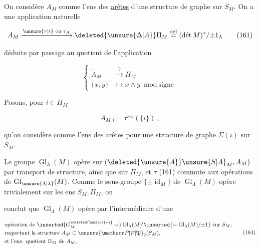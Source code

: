 
On considère $A_M$ comme l'ens des \uline{arêtes} d'une structure de graphe sur $S_M$.  On a une application naturelle

\[
 A_M \xrightarrow{\unsure{\tau|t}\text{ ou }\tau_A} \deleted{\unsure{\Delta|A}}\Pi_M \overset{\text{déf}}{=} (\text{dét}\,M)^*/{\pm 1_\Lambda}
 \tag*{(161)}
\]


déduite par passage au quotient de l'application

\[
 \left\{\begin{aligned}
  \widetilde A_M &\xrightarrow{\widetilde\tau} \Pi_M \\
  \{x,y\} &\longmapsto x\wedge y \bmod\text{signe}
 \end{aligned}\right.
 \tag*{(162)}
\]


Posons, pour $i\in\Pi_M$

\[
 A_{M,i}=\tau^{-1}(\{i\})\ , \tag*{(163)}
\]

qu'on considère comme l'ens des arêtes pour une structure de graphe  $\Sigma(i)$ sur $S_M$.

Le groupe $\operatorname{Gl}_\Lambda(M)$ opère sur $(\deleted{\unsure{A}}\unsure{S|A}_M,A_M)$ par transport de structure, ainsi que sur $\Pi_M$, et $\tau$ (161) commute aux opérations de $\operatorname{Gl}_{\unsure{\Lambda|\lambda}}(M)$. Comme le sous-groupe $\{\pm\operatorname{id}_M\}$ de $\operatorname{Gl}_\Lambda(M)$ opère trivialement sur les ens $S_M,\Pi_M$, on


conclut que $\operatorname{Gl}_\Lambda(M)$ opère par l'intermédiaire d'une 

\[
 \begin{aligned}
 &\text{opération de } \inserted{G_M^{\deleted{\unsure{*}}}=}\operatorname{Gl}_\Lambda(M)' \inserted{=\operatorname{Gl}_\Lambda(M)/{\pm1}}\text{ sur } S_M,\\
 &\text{respectant la structure } A_M\subset\unsure{\mathscr P|\mathcal P|\mathfrak P}_2(S_M),\\
 &\text{et l'ens. quotient }\Pi_M\text{ de }A_M,
 \end{aligned}\tag*{(164)}
\]

